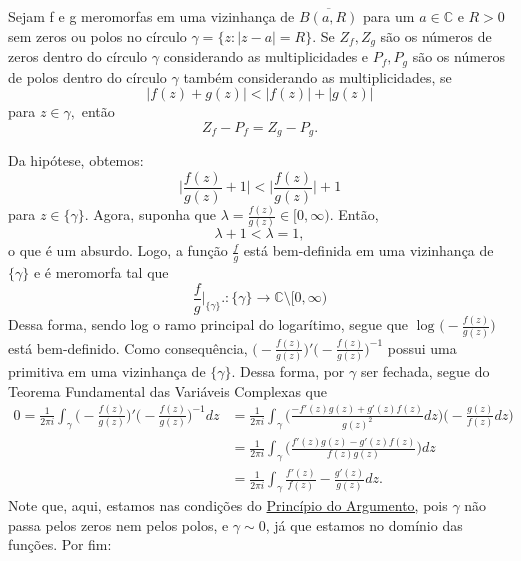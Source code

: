 \documentclass[complex.tex]{subfiles}
\begin{document}
\hypertarget{rouche}{\begin{theorem*}
		Sejam f e g meromorfas em uma vizinhança de \(\overline{B(a, R)}\) para um \(a\in \mathbb{C}\) e \(R > 0\) sem zeros ou polos no círculo \(\gamma = \{z: |z-a| = R\}.\)
		Se \(Z_{f}, Z_{g}\) são os números de zeros dentro do círculo \(\gamma \) considerando as multiplicidades e \(P_{f}, P_{g}\) são os números de polos dentro do círculo \(\gamma \) também
		considerando as multiplicidades, se
		\[
			|f(z) + g(z)| < |f(z)| + |g(z)|
		\]
		para \(z\in \gamma ,\) então
		\[
			Z_{f} - P_{f} = Z_{g} - P_{g}.
		\]
	\end{theorem*}}
\begin{proof*}
	Da hipótese, obtemos:
	\[
		\biggl\vert \frac{f(z)}{g(z)} + 1 \biggr\vert < \biggl\vert \frac{f(z)}{g(z)} \biggr\vert + 1
	\]
	para \(z\in \{\gamma \}\). Agora, suponha que \(\lambda = \frac{f(z)}{g(z)}\in [0, \infty).\) Então,
	\[
		\lambda + 1 < \lambda  = 1,
	\]
	o que é um absurdo. Logo, a função \(\frac{f}{g}\) está bem-definida em uma vizinhança de \(\{\gamma \}\) e é meromorfa tal que
	\[
		\frac{f}{g}\biggl|_{\{\gamma \}}\biggr.:\{\gamma \}\rightarrow \mathbb{C}\setminus{[0, \infty)}
	\]
	Dessa forma, sendo log o ramo principal do logarítimo, segue que \(\log^{}{\biggl(-\frac{f(z)}{g(z)}\biggr)}\) está bem-definido. Como consequência,
	\(\biggl(-\frac{f(z)}{g(z)}\biggr)'\biggl(-\frac{f(z)}{g(z)}\biggr)^{-1}\) possui uma primitiva em uma vizinhança de \(\{\gamma \}.\) Dessa forma, por \(\gamma \)
	ser fechada, segue do Teorema Fundamental das Variáveis Complexas que
	\begin{align*}
		0 = \frac{1}{2\pi i}\int_{\gamma }^{}\biggl(-\frac{f(z)}{g(z)}\biggr)'\biggl(-\frac{f(z)}{g(z)}\biggr)^{-1}dz & = \frac{1}{2\pi i}\int_{\gamma }^{}\biggl(\frac{-f'(z)g(z) + g'(z)f(z)}{g(z)^{2}}dz\biggr)\biggl(-\frac{g(z)}{f(z)}dz\biggr) \\
		                                                                                                              & = \frac{1}{2\pi i}\int_{\gamma }^{}\biggl(\frac{f'(z)g(z) - g'(z)f(z)}{f(z)g(z)}\biggr)dz                                    \\
		                                                                                                              & = \frac{1}{2\pi i}\int_{\gamma }^{}\frac{f'(z)}{f(z)} - \frac{g'(z)}{g(z)}dz.
	\end{align*}
	Note que, aqui, estamos nas condições do \hyperlink{argument-principle}{Princípio do Argumento,} pois \(\gamma \) não passa pelos zeros nem pelos polos, e \(\gamma \sim 0\), já que estamos no domínio das funções. Por fim:

\end{proof*}
\end{document}
